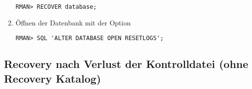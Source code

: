 \begin{enumerate}
              \begin{lstlisting}[caption={Recovern der Datenbank},label=admin1514,language=rman]
RMAN> RECOVER database;
              \end{lstlisting}
            \item \"Offnen der Datenbank mit der Option 
              \begin{lstlisting}[caption={Datenbank mit open resetlogs \"offnen},label=admin1515,language=rman,emph={[9]ALTER,DATABASE,OPEN,RESETLOGS},emphstyle={[9]\color{magenta}\bfseries}]
RMAN> SQL 'ALTER DATABASE OPEN RESETLOGS';
              \end{lstlisting}
            \end{enumerate}
\clearpage
      \subsection{Recovery nach Verlust der Kontrolldatei (ohne Recovery Katalog)}
